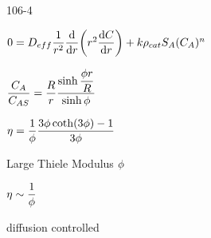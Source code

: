 \begin{mitframe}{106-4}
\begin{listone}
	\item $0=\elecdisplace_{eff}\dfrac{1}{\pos^2}\dfrac{\mathrm{d}}{\mathrm{d}\pos}\bigg(\pos^2\dfrac{\mathrm{d}\conc}{\mathrm{d}\pos}\bigg)+\thermcond\dens_{cat}\entropy_{\helmholtz}(\conc_{\helmholtz})^n$
    	\begin{listtwo}
        	\item $\dfrac{\conc_{\helmholtz}}{\conc_{\helmholtz\entropy}}=\dfrac{\gasconst}{\pos}\dfrac{\sinh\dfrac{\eleccoeff\pos}{\gasconst}}{\sinh\eleccoeff}$
            \item $\intrinsvisc=\dfrac{1}{\eleccoeff}\dfrac{3\eleccoeff\coth(3\eleccoeff)-1}{3\eleccoeff}$
            \item Large Thiele Modulus $\eleccoeff$
            	\begin{listthree}
                	\item $\intrinsvisc\sim\dfrac{1}{\eleccoeff}$
                    \item diffusion controlled
                \end{listthree}
        \end{listtwo}
\end{listone}  
\end{mitframe}